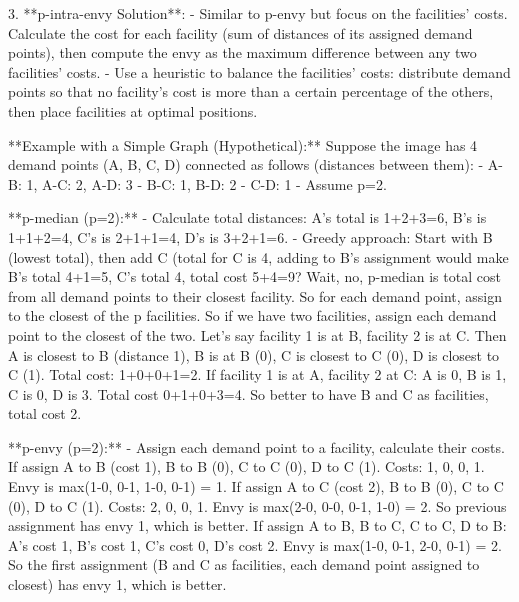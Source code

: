 3. **p-intra-envy Solution**:
   - Similar to p-envy but focus on the facilities' costs. Calculate the cost for each facility (sum of distances of its assigned demand points), then compute the envy as the maximum difference between any two facilities' costs.
   - Use a heuristic to balance the facilities' costs: distribute demand points so that no facility's cost is more than a certain percentage of the others, then place facilities at optimal positions.

**Example with a Simple Graph (Hypothetical):**
Suppose the image has 4 demand points (A, B, C, D) connected as follows (distances between them):
- A-B: 1, A-C: 2, A-D: 3
- B-C: 1, B-D: 2
- C-D: 1
- Assume p=2.

**p-median (p=2):**
- Calculate total distances: A's total is 1+2+3=6, B's is 1+1+2=4, C's is 2+1+1=4, D's is 3+2+1=6.
- Greedy approach: Start with B (lowest total), then add C (total for C is 4, adding to B's assignment would make B's total 4+1=5, C's total 4, total cost 5+4=9? Wait, no, p-median is total cost from all demand points to their closest facility. So for each demand point, assign to the closest of the p facilities. So if we have two facilities, assign each demand point to the closest of the two. Let's say facility 1 is at B, facility 2 is at C. Then A is closest to B (distance 1), B is at B (0), C is closest to C (0), D is closest to C (1). Total cost: 1+0+0+1=2. If facility 1 is at A, facility 2 at C: A is 0, B is 1, C is 0, D is 3. Total cost 0+1+0+3=4. So better to have B and C as facilities, total cost 2.

**p-envy (p=2):**
- Assign each demand point to a facility, calculate their costs. If assign A to B (cost 1), B to B (0), C to C (0), D to C (1). Costs: 1, 0, 0, 1. Envy is max(1-0, 0-1, 1-0, 0-1) = 1. If assign A to C (cost 2), B to B (0), C to C (0), D to C (1). Costs: 2, 0, 0, 1. Envy is max(2-0, 0-0, 0-1, 1-0) = 2. So previous assignment has envy 1, which is better. If assign A to B, B to C, C to C, D to B: A's cost 1, B's cost 1, C's cost 0, D's cost 2. Envy is max(1-0, 0-1, 2-0, 0-1) = 2. So the first assignment (B and C as facilities, each demand point assigned to closest) has envy 1, which is better.


